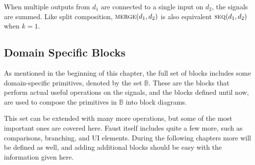 When multiple outputs from $d_1$ are connected to a single input on $d_2$,
the signals are summed. Like split composition, $\Merge(d_1, d_2)$ is also equivalent
$\Sequential(d_1, d_2)$ when $k = 1$.

\begin{minipage}{0.5\linewidth}
  \begin{prooftree}
  \end{prooftree}
  \begin{prooftree}
  \end{prooftree}
\end{minipage}
\begin{minipage}{0.5\linewidth}
  \begin{figure}[H]
    \centering
    \label{fig:block_merge}
    
  \end{figure}
\end{minipage}

\subsection{Domain Specific Blocks}
\label{sec:block_domain_spec}

As mentioned in the beginning of this chapter, the full set of blocks includes some domain-specific
primitives, denoted by the set $\mathbb B$. These are the blocks that perform actual useful
operations on the signals, and the blocks defined until now, are used to compose the primitives in
$\mathbb B$ into block diagrams.

This set can be extended with many more operations, but some of the most important ones are covered here.
Faust itself includes quite a few more\autocite{orlarey2004}, such as comparisons, branching, and UI
elements. During the following chapters more will be defined as well, and adding additional blocks should be
easy with the information given here.

